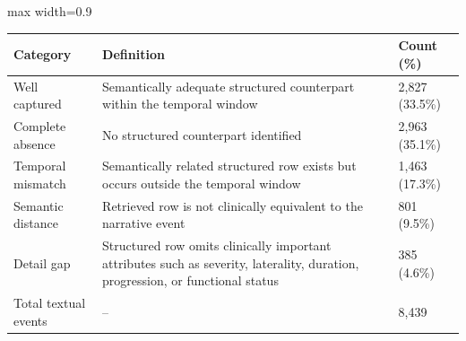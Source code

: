 \begin{table}[!t]
{
\setlength{\tabcolsep}{5pt}
\renewcommand{\arraystretch}{1.12}
{
\begin{adjustbox}{max width=0.9\textwidth}
\scriptsize
\begin{tabular}
{p{}p{}p{}}
\hline
\textbf{Category} & \textbf{Definition} & \textbf{Count (\%)} \\
\hline
Well captured 
& Semantically adequate structured counterpart within the temporal window 
& 2,827 (33.5\%) \\

Complete absence 
& No structured counterpart identified 
& 2,963 (35.1\%) \\

Temporal mismatch 
& Semantically related structured row exists but occurs outside the temporal window 
& 1,463 (17.3\%) \\

Semantic distance 
& Retrieved row is not clinically equivalent to the narrative event 
& 801 (9.5\%) \\

Detail gap 
& Structured row omits clinically important attributes such as severity, laterality, duration, progression, or functional status 
& 385 (4.6\%) \\
\hline
Total textual events & -- & 8,439 \\
\hline
\end{tabular}
\end{adjustbox}
}
\label{tab:gap_analysis}
}
\vspace{-1em}
\end{table}




